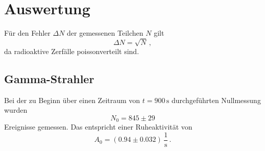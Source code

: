 \section{Auswertung}
\label{sec:Auswertung}
Für den Fehler $\Delta N$ der gemessenen Teilchen $N$ gilt
\begin{equation*}
    \Delta N = \sqrt{N} \,,
\end{equation*}
da radioaktive Zerfälle poissonverteilt sind.

\subsection{Gamma-Strahler}



Bei der zu Beginn über einen Zeitraum von $t = 900 \,\unit{\second}$ durchgeführten Nullmessung wurden
\begin{equation*}
    N_0  = 845 \pm 29
\end{equation*}
Ereignisse gemessen.
Das entspricht einer Ruheaktivität von
\begin{equation*}
    A_0 = (0.94 \pm 0.032) \,\dfrac{1}{\unit{\second}} \, .
\end{equation*}

